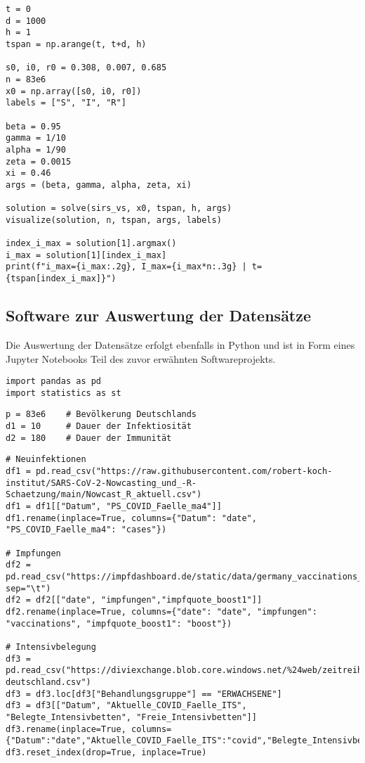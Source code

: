 \documentclass[../main.tex]{subfiles}
\begin{document}
\begin{lstlisting}[title=Simulation des Standardszenarios des erweiterten Modells:]
t = 0
d = 1000
h = 1
tspan = np.arange(t, t+d, h)

s0, i0, r0 = 0.308, 0.007, 0.685
n = 83e6
x0 = np.array([s0, i0, r0])
labels = ["S", "I", "R"]

beta = 0.95
gamma = 1/10
alpha = 1/90
zeta = 0.0015
xi = 0.46
args = (beta, gamma, alpha, zeta, xi)

solution = solve(sirs_vs, x0, tspan, h, args)
visualize(solution, n, tspan, args, labels)

index_i_max = solution[1].argmax()
i_max = solution[1][index_i_max]
print(f"i_max={i_max:.2g}, I_max={i_max*n:.3g} | t={tspan[index_i_max]}")
\end{lstlisting}



    \subsection*{Software zur Auswertung der Datensätze}
    \label{ap:evaluation}
    Die Auswertung der Datensätze erfolgt ebenfalls in Python und ist in Form eines Jupyter Notebooks Teil des zuvor erwähnten Softwareprojekts.

\begin{lstlisting}[title=Importierung der verwendeten Programmbibliotheken:]
import pandas as pd
import statistics as st
\end{lstlisting}

\begin{lstlisting}[title=Definition von Konstanten:]
p = 83e6    # Bevölkerung Deutschlands
d1 = 10     # Dauer der Infektiosität
d2 = 180    # Dauer der Immunität
\end{lstlisting}

\begin{lstlisting}[title=Laden der Datensätze:]
# Neuinfektionen
df1 = pd.read_csv("https://raw.githubusercontent.com/robert-koch-institut/SARS-CoV-2-Nowcasting_und_-R-Schaetzung/main/Nowcast_R_aktuell.csv")
df1 = df1[["Datum", "PS_COVID_Faelle_ma4"]]
df1.rename(inplace=True, columns={"Datum": "date", "PS_COVID_Faelle_ma4": "cases"})

# Impfungen
df2 = pd.read_csv("https://impfdashboard.de/static/data/germany_vaccinations_timeseries_v3.tsv", sep="\t")
df2 = df2[["date", "impfungen","impfquote_boost1"]]
df2.rename(inplace=True, columns={"date": "date", "impfungen": "vaccinations", "impfquote_boost1": "boost"})

# Intensivbelegung
df3 = pd.read_csv("https://diviexchange.blob.core.windows.net/%24web/zeitreihe-deutschland.csv")
df3 = df3.loc[df3["Behandlungsgruppe"] == "ERWACHSENE"]
df3 = df3[["Datum", "Aktuelle_COVID_Faelle_ITS", "Belegte_Intensivbetten", "Freie_Intensivbetten"]]
df3.rename(inplace=True, columns={"Datum":"date","Aktuelle_COVID_Faelle_ITS":"covid","Belegte_Intensivbetten":"occupied","Freie_Intensivbetten":"free"})
df3.reset_index(drop=True, inplace=True)
\end{lstlisting}
\end{document}

